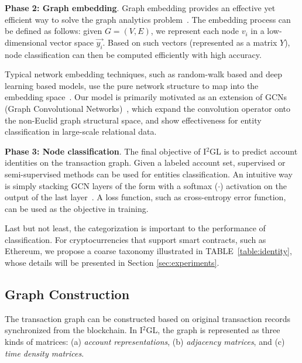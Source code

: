 
\textbf{Phase 2: Graph embedding}.
Graph embedding provides an effective yet efficient way to solve the graph analytics problem~\cite{cai2018comprehensive}. The embedding process can be defined as follows: given $G=(V,E)$, we represent each node $v_{i}$ in a low-dimensional vector space $\vec{y_i}$. Based on such vectors (represented as a matrix $Y$), node classification can then be computed efficiently with high accuracy.

Typical network embedding techniques, such as random-walk based and deep learning based models, use the pure network structure to map into the embedding space~\cite{goyal2018capturing}. Our model is primarily motivated as an extension of GCNs (Graph Convolutional Networks)~\cite{kipf2016semi,schlichtkrull2018modeling}, which expand the convolution operator onto the non-Euclid graph structural space, and show effectiveness for entity classification in large-scale relational data.

\textbf{Phase 3: Node classification}.
The final objective of I$^2$GL is to predict account identities on the transaction graph. Given a labeled account set, supervised or semi-supervised methods can be used for entities classification. An intuitive way is simply stacking GCN layers of the form with a softmax ($\cdot$) activation on the output of the last layer~\cite{schlichtkrull2018modeling}. A loss function, such as cross-entropy error function, can be used as the objective in training.

Last but not least, the categorization is important to the performance of classification. For cryptocurrencies that support smart contracts, such as Ethereum, we propose a coarse taxonomy illustrated in TABLE~\ref{table:identity}, whose details will be presented in Section \ref{sec:experiments}.


\subsection{Graph Construction}
The transaction graph can be constructed based on original transaction records synchronized from the blockchain. In I$^2$GL, the graph is represented as three kinds of matrices: (a) \emph{account representations}, (b) \emph{adjacency matrices}, and (c) \emph{time density matrices}.


